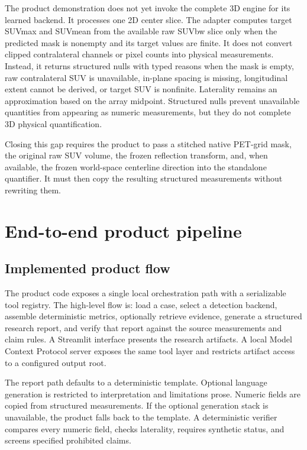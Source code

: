 \documentclass[11pt]{article}
\begin{document}
The product demonstration does not yet invoke the complete 3D engine for its learned backend. It processes one 2D center slice. The adapter computes target SUVmax and SUVmean from the available raw SUVbw slice only when the predicted mask is nonempty and its target values are finite. It does not convert clipped contralateral channels or pixel counts into physical measurements. Instead, it returns structured nulls with typed reasons when the mask is empty, raw contralateral SUV is unavailable, in-plane spacing is missing, longitudinal extent cannot be derived, or target SUV is nonfinite. Laterality remains an approximation based on the array midpoint. Structured nulls prevent unavailable quantities from appearing as numeric measurements, but they do not complete 3D physical quantification.

Closing this gap requires the product to pass a stitched native PET-grid mask, the original raw SUV volume, the frozen reflection transform, and, when available, the frozen world-space centerline direction into the standalone quantifier. It must then copy the resulting structured measurements without rewriting them.

\section{End-to-end product pipeline}

\subsection{Implemented product flow}

The product code exposes a single local orchestration path with a serializable tool registry. The high-level flow is: load a case, select a detection backend, assemble deterministic metrics, optionally retrieve evidence, generate a structured research report, and verify that report against the source measurements and claim rules. A Streamlit interface presents the research artifacts. A local Model Context Protocol server exposes the same tool layer and restricts artifact access to a configured output root.

The report path defaults to a deterministic template. Optional language generation is restricted to interpretation and limitations prose. Numeric fields are copied from structured measurements. If the optional generation stack is unavailable, the product falls back to the template. A deterministic verifier compares every numeric field, checks laterality, requires synthetic status, and screens specified prohibited claims.
\end{document}
